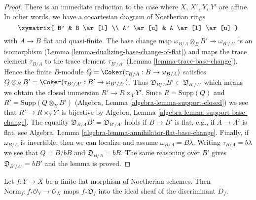 \begin{proof}
There is an immediate reduction to the case where $X$, $X'$, $Y$, $Y'$
are affine. In other words, we have a cocartesian diagram of Noetherian
rings
$$
\xymatrix{
B' & B \ar[l] \\
A' \ar[u] & A \ar[l] \ar[u]
}
$$
with $A \to B$ flat and quasi-finite. The base change map
$\omega_{B/A} \otimes_B B' \to \omega_{B'/A'}$ is an isomorphism
(Lemma \ref{lemma-dualizing-base-change-of-flat}) and maps
the trace element $\tau_{B/A}$ to the trace element $\tau_{B'/A'}$
(Lemma \ref{lemma-trace-base-change}).
Hence the finite $B$-module $Q = \Coker(\tau_{B/A} : B \to \omega_{B/A})$
satisfies $Q \otimes_B B' = \Coker(\tau_{B'/A'} : B' \to \omega_{B'/A'})$.
Thus $\mathfrak{D}_{B/A}B' \subset \mathfrak{D}_{B'/A'}$ which means
we obtain the closed immersion $R' \to R \times_Y Y'$.
Since $R = \text{Supp}(Q)$ and $R' = \text{Supp}(Q \otimes_B B')$
(Algebra, Lemma \ref{algebra-lemma-support-closed})
we see that $R' \to R \times_Y Y'$ is bijective by
Algebra, Lemma \ref{algebra-lemma-support-base-change}.
The equality $\mathfrak{D}_{B/A}B' = \mathfrak{D}_{B'/A'}$ holds
if $B \to B'$ is flat, e.g., if $A \to A'$ is flat, see
Algebra, Lemma \ref{algebra-lemma-annihilator-flat-base-change}.
Finally, if $\omega_{B/A}$ is invertible, then we can localize
and assume $\omega_{B/A} = B \lambda$. Writing $\tau_{B/A} = b\lambda$
we see that $Q = B/bB$ and $\mathfrak{D}_{B/A} = bB$.
The same reasoning over $B'$
gives $\mathfrak{D}_{B'/A'} = bB'$ and the lemma is proved.
\end{proof}

\begin{lemma}
\label{lemma-norm-different-in-discriminant}
Let $f : Y \to X$ be a finite flat morphism of Noetherian schemes.
Then $\text{Norm}_f : f_*\mathcal{O}_Y \to \mathcal{O}_X$ maps
$f_*\mathfrak{D}_f$ into the ideal sheaf of the discriminant $D_f$.
\end{lemma}

